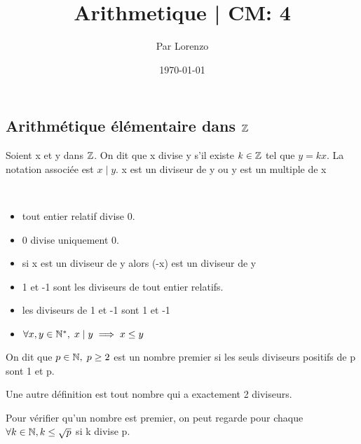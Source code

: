 \documentclass[a4paper, 12pt]{article}
\title{Arithmetique | CM: 4}
\author{Par Lorenzo}
\date{\today}
\begin{document}
\maketitle

\subsection{Arithmétique élémentaire dans $\mathbb{Z}$}

\begin{definition}
    Soient x et y dans $\mathbb{Z}$. On dit que x divise y s'il existe $k \in \mathbb{Z}$ tel que $y = kx$.
    La notation associée est $x \mid y$.
    x est un diviseur de y ou y est un multiple de x
\end{definition}

\begin{remark}\
    \begin{itemize}
        \item tout entier relatif divise 0.
        
        \item 0 divise uniquement 0.
        
        \item si x est un diviseur de y alors (-x) est un diviseur de y
        
        \item 1 et -1 sont les diviseurs de tout entier relatifs.
        
        \item les diviseurs de 1 et -1 sont 1 et -1
        
        \item $\forall x, y \in \mathbb{N}^*,\; x \mid y \implies x \leq y$
    \end{itemize}
\end{remark}

\begin{definition}
    On dit que $p \in \mathbb{N},\; p \geq 2$ est un nombre premier si les seuls diviseurs positifs de p sont 1 et p.
\end{definition}

\begin{remark}
    Une autre définition est tout nombre qui a exactement 2 diviseurs.
\end{remark}

\begin{remark}
    Pour vérifier qu'un nombre est premier, on peut regarde pour chaque $\forall k \in \mathbb{N}, k \leq \sqrt{p}$ si k divise p.
\end{remark}
\end{document}
